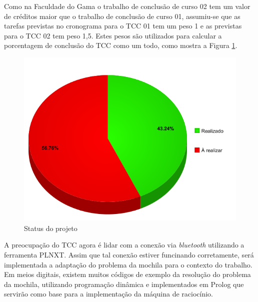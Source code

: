 Como na Faculdade do Gama o trabalho de conclusão de curso 02 tem um valor de créditos maior que o trabalho de conclusão de curso 01, assumiu-se que as tarefas previstas no cronograma para o TCC 01 tem um peso 1 e as previstas para o TCC 02 tem peso 1,5. Estes pesos são utilizados para calcular a porcentagem de conclusão do TCC como um todo, como mostra a Figura \ref{TCC}.

\FloatBarrier
\begin{figure}[!h]
\centering
\includegraphics[keepaspectratio=true,scale=0.5]{figuras/TCC.png}
\caption{Status do projeto}
\label{TCC}
\end{figure}

A preocupação do TCC agora é lidar com a conexão via \textit{bluetooth} utilizando a ferramenta PLNXT. Assim que tal conexão estiver funcinando corretamente, será implementada a adaptação do problema da mochila para o contexto do trabalho. Em meios digitais, existem muitos códigos de exemplo da resolução do problema da mochila, utilizando programação dinâmica e implementados em Prolog que servirão como base para a implementação da máquina de raciocínio. 